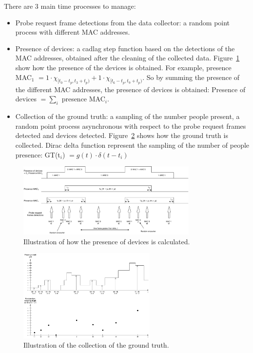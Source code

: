There are 3 main time processes to manage:
\begin{itemize}
  \item Probe request frame detections from the data collector: a random point process with different MAC addresses.
  \item Presence of devices: a cadlag step function based on the detections of the MAC addresses, obtained after the cleaning of the collected data. Figure~\ref{fig:presenceMAC} show how the presence of the devices is obtained. For example, presence MAC$_1$ $= 1 \cdot \chi_{[ t_{0} - t_{p}, t_{3} + t_{p} )} + 1 \cdot \chi_{[ t_{6} - t_{p}, t_{9} + t_{p} )}$. So by summing the presence of the different MAC addresses, the presence of devices is obtained: Presence of devices $= \sum_i$ presence MAC$_i$.
  \item Collection of the ground truth: a sampling of the number people present, a random point process asynchronous with respect to the probe request frames detected and devices detected. Figure~\ref{fig:GTprocess} shows how the ground truth is collected. Dirac delta function represent the sampling of the number of people presence: GT(t$_i$) $= g(t) \cdot \delta(t - t_{i})$
\end{itemize}

\begin{figure}[h]
\centering 
\includegraphics[width=0.8\textwidth]{images/presenceMAC} 
\caption{Illustration of how the presence of devices is calculated.}
\label{fig:presenceMAC}
\end{figure}

\begin{figure}[h]
\centering 
\includegraphics[width=0.61\textwidth]{images/GTprocess} 
\caption{Illustration of the collection of the ground truth.}
\label{fig:GTprocess}
\end{figure}
